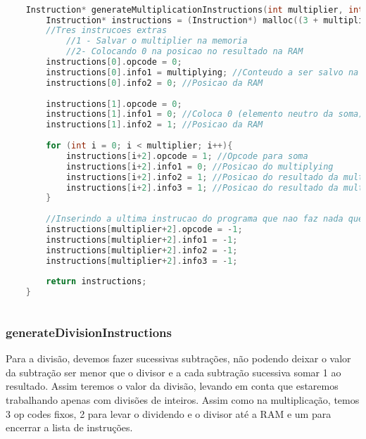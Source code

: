 \documentclass{article}
\begin{document}
\begin{lstlisting}[caption={Função generateMultiplicationInstructions},label={lst:cod1},language=C]

    Instruction* generateMultiplicationInstructions(int multiplier, int multiplying){
        Instruction* instructions = (Instruction*) malloc((3 + multiplier) * sizeof(Instruction));
        //Tres instrucoes extras
            //1 - Salvar o multiplier na memoria
            //2- Colocando 0 na posicao no resultado na RAM
        instructions[0].opcode = 0;
        instructions[0].info1 = multiplying; //Conteudo a ser salvo na RAM
        instructions[0].info2 = 0; //Posicao da RAM
        
        instructions[1].opcode = 0;
        instructions[1].info1 = 0; //Coloca 0 (elemento neutro da soma)
        instructions[1].info2 = 1; //Posicao da RAM
    
        for (int i = 0; i < multiplier; i++){
            instructions[i+2].opcode = 1; //Opcode para soma
            instructions[i+2].info1 = 0; //Posicao do multiplying 
            instructions[i+2].info2 = 1; //Posicao do resultado da multiplicacao
            instructions[i+2].info3 = 1; //Posicao do resultado da multiplicacao
        }
    
        //Inserindo a ultima instrucao do programa que nao faz nada que presta
        instructions[multiplier+2].opcode = -1;
        instructions[multiplier+2].info1 = -1;
        instructions[multiplier+2].info2 = -1;
        instructions[multiplier+2].info3 = -1;
    
        return instructions;
    }
    
\end{lstlisting}

\clearpage
\subsubsection{generateDivisionInstructions}

Para a divisão, devemos fazer sucessivas subtrações, não podendo deixar o valor da subtração ser menor que o divisor e a cada subtração sucessiva somar 1 ao resultado.
Assim teremos o valor da divisão, levando em conta que estaremos trabalhando apenas com divisões de inteiros. Assim como na multiplicação, temos 3 op codes fixos, 2 para levar o dividendo e o divisor até a RAM
e um para encerrar a lista de instruções.
\end{document}
